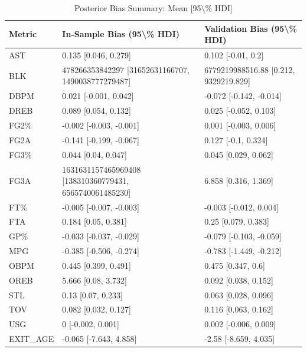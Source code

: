 \begin{table}[t]
\caption*{
{\fontsize{20}{25}\selectfont  Posterior Bias Summary: Mean [95\textbackslash{}\% HDI]\fontsize{12}{15}\selectfont }
} 
\fontsize{12.0pt}{14.0pt}\selectfont
\begin{tabular*}{\linewidth}{@{\extracolsep{\fill}}lll}
\toprule
Metric & In-Sample Bias (95\textbackslash{}\% HDI) & Validation Bias (95\textbackslash{}\% HDI) \\ 
\midrule\addlinespace[2.5pt]
AST & 0.135 [0.046, 0.279] & 0.102 [-0.01, 0.2] \\ 
BLK & 478266353842297 [31652631166707, 1490038777279487] & 6779219988516.88 [0.212, 9329219.829] \\ 
DBPM & 0.021 [-0.001, 0.042] & -0.072 [-0.142, -0.014] \\ 
DREB & 0.089 [0.054, 0.132] & 0.025 [-0.052, 0.103] \\ 
FG2\% & -0.002 [-0.003, -0.001] & 0.001 [-0.003, 0.006] \\ 
FG2A & -0.141 [-0.199, -0.067] & 0.127 [-0.1, 0.324] \\ 
FG3\% & 0.044 [0.04, 0.047] & 0.045 [0.029, 0.062] \\ 
FG3A & 1631631157465969408 [138310360779431, 6565740061485230] & 6.858 [0.316, 1.369] \\ 
FT\% & -0.005 [-0.007, -0.003] & -0.003 [-0.012, 0.004] \\ 
FTA & 0.184 [0.05, 0.381] & 0.25 [0.079, 0.383] \\ 
GP\% & -0.033 [-0.037, -0.029] & -0.079 [-0.103, -0.059] \\ 
MPG & -0.385 [-0.506, -0.274] & -0.783 [-1.449, -0.212] \\ 
OBPM & 0.445 [0.399, 0.491] & 0.475 [0.347, 0.6] \\ 
OREB & 5.666 [0.08, 3.732] & 0.092 [0.038, 0.152] \\ 
STL & 0.13 [0.07, 0.233] & 0.063 [0.028, 0.096] \\ 
TOV & 0.082 [0.032, 0.127] & 0.116 [0.063, 0.162] \\ 
USG & 0 [-0.002, 0.001] & 0.002 [-0.006, 0.009] \\ 
EXIT\_AGE & -0.065 [-7.643, 4.858] & -2.58 [-8.659, 4.035] \\ 
\bottomrule
\end{tabular*}
\end{table}

